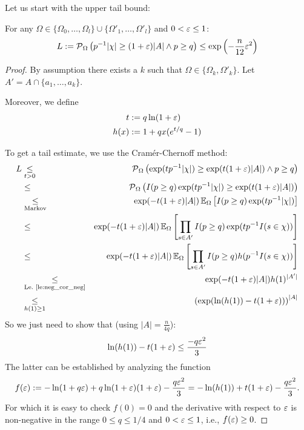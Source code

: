 Let us start with the upper tail bound:
\begin{lemma}
\label{le:upper_tail}
For any $\Omega \in \{\Omega_0,\ldots,\Omega_l\} \cup \{\Omega'_1,\ldots,\Omega'_l\}$ and
$0 < \varepsilon \leq 1$:
\[
L := \operatorname{\mathcal P}_{\Omega} \left( p^{-1} |\chi| \geq (1+\varepsilon) |A| \wedge p \geq q\right) \leq
  \exp\left(-\frac{n}{12} \varepsilon^2\right)
\]
\end{lemma}
\begin{proof}
By assumption there exists a $k$ such that $\Omega \in \{\Omega_k, \Omega'_k\}$.
Let $A' = A \cap \{a_1,\ldots,a_k\}$.

Moreover, we define
\begin{align*}
  t & := q \ln( 1 + \varepsilon) \\
  h(x) & := 1+qx(e^{t/q}-1)  
\end{align*}

To get a tail estimate, we use the Cram\'{e}r-Chernoff method:
{\allowdisplaybreaks
\begin{eqnarray*}
  L & \underset{t > 0}{\leq} & \operatorname{\mathcal P}_{\Omega} \left( \exp(t p^{-1} |\chi|) \geq
    \exp(t (1+\varepsilon) |A|) \wedge p \geq q \right) \\
  & \leq &
    \operatorname{\mathcal P}_{\Omega} \left( I(p \geq q) \exp(t p^{-1} |\chi|) \geq \exp(t (1+\varepsilon) |A|) \right) \\
  & \underset{\textrm{Markov}}{\leq} &
    \exp( -t (1+\varepsilon) |A| ) \operatorname{\mathbb E}_\Omega \left[ I(p \geq q) \exp ( t p^{-1} |\chi| ) \right] \\
 & \leq & \exp( -t (1+\varepsilon) |A| ) 
  \operatorname{\mathbb E}_\Omega \left[ \prod_{s \in A'} I(p \geq q) \exp ( t p^{-1} I(s \in \chi) ) \right] \\
 & \leq & \exp( -t (1+\varepsilon) |A| ) 
  \operatorname{\mathbb E}_\Omega \left[ \prod_{s \in A'} I(p \geq q) h( p^{-1} I(s \in \chi) ) \right] \\
 & \underset{\textrm{Le.~\ref{le:neg_cor_neg}}}{\leq} & \exp( -t (1+\varepsilon) |A| ) h(1)^{|A'|} \\
 & \underset{h(1)\geq 1}{\leq} & \left(\exp( \ln(h(1)) -t (1+\varepsilon))\right) ^ {|A|} 
\end{eqnarray*}}
So we just need to show that (using $|A|=\frac{n}{4q}$):
\[
  \ln(h(1))-t (1+\varepsilon) \leq \frac{-q \varepsilon^2}{3}
\]
The latter can be established by analyzing the function
\[
  f(\varepsilon) := -\ln(1+q \varepsilon) + q \ln(1+\varepsilon) (1+\varepsilon) - \frac{q \varepsilon^2}{3} =
    -\ln (h(1)) +t (1+\varepsilon) - \frac{q\varepsilon^2}{3} \textrm{.}
\]
For which it is easy to check $f(0) = 0$ and the derivative with respect to $\varepsilon$ is non-negative
in the range $0 \leq q \leq 1/4$ and $0 < \varepsilon \leq 1$, i.e., $f(\varepsilon) \geq 0$.
\end{proof}

